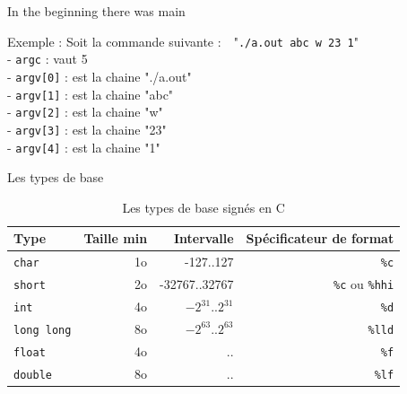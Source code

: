   	\begin{frame}{In the beginning there was main}
	  	\begin{exampleblock}{Exemple :}
	  		Soit la commande suivante :~~"\texttt{./a.out abc w 23 1}" \\
	  		- \texttt{argc} : vaut 5 \\
	  		- \texttt{argv[0]} : est la chaine "./a.out" \\
	  		- \texttt{argv[1]} : est la chaine "abc" \\
	  		- \texttt{argv[2]} : est la chaine "w" \\
	  		- \texttt{argv[3]} : est la chaine "23" \\
	  		- \texttt{argv[4]} : est la chaine "1" \\
	  	\end{exampleblock}
  	\end{frame}
  
  	\begin{frame}{Les types de base}
  		\begin{table}[!b]
  			{\carlitoTLF %
  			\begin{tabularx}{\textwidth}{Xrrr}
  				\textbf{Type} & \textbf{Taille min} & \textbf{Intervalle} & \textbf{Spécificateur de format} \\
  				\toprule
  				\texttt{char}      & 1o  & -127..127  		   & \texttt{\%c}    				    \\
  				\texttt{short}     & 2o  & -32767..32767  	   & \texttt{\%c} ou \texttt{\%hhi}     \\
  				\texttt{int}       & 4o  & $-2^{31}$..$2^{31}$ & \texttt{\%d}    				    \\
  				\texttt{long long} & 8o  & $-2^{63}$..$2^{63}$ & \texttt{\%lld}  				    \\
  				\texttt{float}     & 4o  &    ..    		   & \texttt{\%f}    				    \\
  				\texttt{double}    & 8o  &    ..   			   & \texttt{\%lf}   					\\
  				\bottomrule
  			\end{tabularx}}
  			\caption{Les types de base signés en C}
  		\end{table}
  	\end{frame}
  
